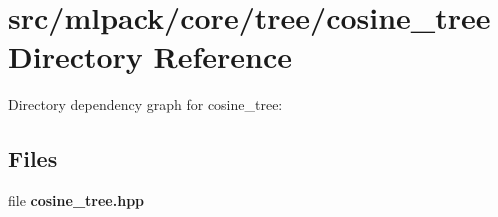 \section{src/mlpack/core/tree/cosine\-\_\-tree Directory Reference}
\label{dir_9c9698c323d9e711499953999cc67a40}
Directory dependency graph for cosine\-\_\-tree\-:
\subsection*{Files}
\begin{DoxyCompactItemize}
\item 
file {\bf cosine\-\_\-tree.\-hpp}
\end{DoxyCompactItemize}
